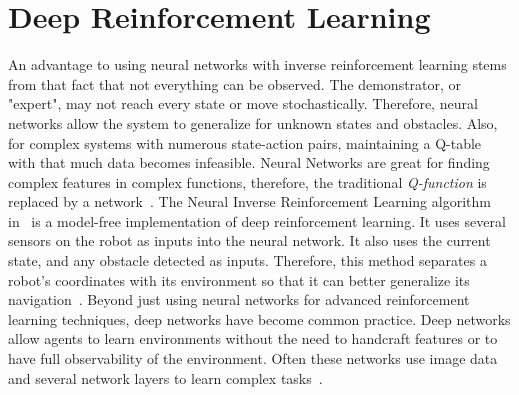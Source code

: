 \documentclass[12pt,american]{report}
\begin{document}
\chapter{Deep Reinforcement Learning}
An advantage to using neural networks with inverse reinforcement learning stems from that fact that not everything can be observed. The demonstrator, or "expert", may not reach every state or move stochastically. Therefore, neural networks allow the system to generalize for unknown states and obstacles. Also, for complex systems with numerous state-action pairs, maintaining a Q-table with that much data becomes infeasible. Neural Networks are great for finding complex features in complex functions, therefore, the traditional \textit{Q-function} is replaced by a network~\cite{matiisen_2015}. The Neural Inverse Reinforcement Learning algorithm in~\cite{xia2016neural} is a model-free implementation of deep reinforcement learning. It uses several sensors on the robot as inputs into the neural network.  It also uses the current state, and any obstacle detected as inputs. Therefore, this method separates a robot's coordinates with its environment so that it can better generalize its navigation~\cite{xia2016neural}. Beyond just using neural networks for advanced reinforcement learning techniques, deep networks have become common practice. Deep networks allow agents to learn environments without the need to handcraft features or to have full observability of the environment. Often these networks use image data and several network layers to learn complex tasks~\cite{atari}.
	
\end{document}
